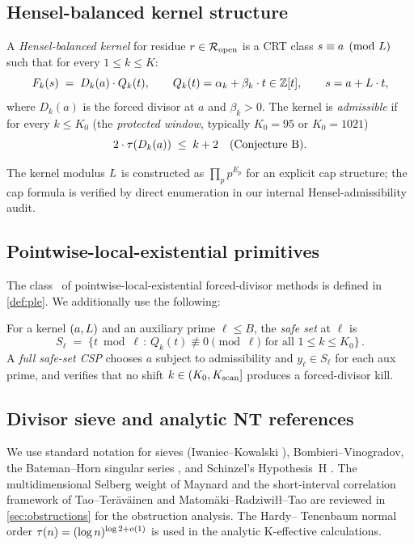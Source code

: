 \subsection{Hensel-balanced kernel structure}

\begin{notation}
A \emph{Hensel-balanced kernel} for residue $r \in \mathcal{R}_{\mathrm{open}}$ is a CRT
class $s \equiv a \pmod{L}$ such that for every $1 \le k \le K$:
\[
F_k(s) \;=\; D_k(a) \cdot Q_k(t) , \qquad
Q_k(t) = \alpha_k + \beta_k \cdot t \in \mathbb{Z}[t] , \qquad
s = a + L \cdot t,
\]
where $D_k(a)$ is the forced divisor at $a$ and $\beta_k > 0$. The
kernel is \emph{admissible} if for every $k \le K_0$ (the
\emph{protected window}, typically $K_0 = 95$ or $K_0 = 1021$)
\[
2 \cdot \tau(D_k(a)) \;\le\; k + 2 \quad \text{(Conjecture B)} .
\]

The kernel modulus $L$ is constructed as $\prod_p p^{E_p}$ for an
explicit cap structure; the cap formula is verified by direct enumeration in our internal Hensel-admissibility audit.
\end{notation}

\subsection{Pointwise-local-existential primitives}

The class \PLEclass\ of pointwise-local-existential forced-divisor
methods is defined in \cref{def:ple}. We additionally use the
following:

\begin{notation}
For a kernel $(a, L)$ and an auxiliary prime $\ell \le B$,
the \emph{safe set} at $\ell$ is
\[
S_\ell \;=\; \bigl\{ t \bmod \ell \,:\, Q_k(t) \not\equiv 0 \pmod \ell
\text{ for all } 1 \le k \le K_0 \bigr\} \,.
\]
A \emph{full safe-set CSP} chooses $a$ subject to admissibility and
$y_\ell \in S_\ell$ for each aux prime, and verifies that no shift
$k \in (K_0, K_{\rm scan}]$ produces a forced-divisor kill.
\end{notation}

\subsection{Divisor sieve and analytic NT references}

We use standard notation for sieves
(Iwaniec--Kowalski \cite{IwaniecKowalski2004}), Bombieri--Vinogradov,
the Bateman--Horn singular series \cite{BatemanHorn1962}, and
Schinzel's Hypothesis~H \cite{SchinzelSierpinski1958}. The
multidimensional Selberg weight of Maynard \cite{Maynard2013} and the
short-interval correlation framework of
Tao--Ter\"av\"ainen \cite{TaoTeravainen2025} and
Matom\"aki--Radziwi\l{}\l --Tao \cite{MRT2019} are reviewed in
\cref{sec:obstructions} for the obstruction analysis. The Hardy--
Tenenbaum normal order $\tau(n) = (\log n)^{\log 2 + o(1)}$
\cite{HardyTenenbaum2008} is used in the analytic K-effective
calculations.

